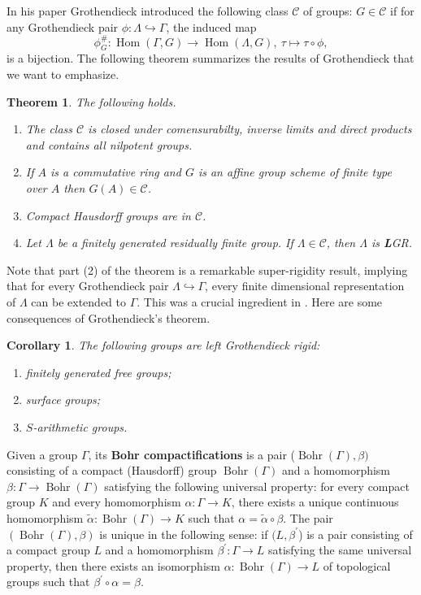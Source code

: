 \documentclass{amsart}
\newtheorem{teo}[lem]{Theorem}
\newtheorem{cor}[lem]{Corollary}
\theoremstyle{definition}
\theoremstyle{remark}
\DeclareMathOperator{\B}{Bohr}
\DeclareMathOperator{\Hom}{Hom}
\begin{document}
 
In his paper Grothendieck introduced the   following class  $\mathcal C$ of groups: $G\in  \mathcal C$ if for any Grothendieck pair $\phi:\Lambda \hookrightarrow \Gamma$, the induced map 
$$\phi^{\#}_G: \Hom (\Gamma, G)\to \Hom (\Lambda, G), \ \tau\mapsto \tau\circ \phi,$$  is a bijection. The following theorem summarizes the results of Grothendieck that we want to emphasize.
\begin{teo}\label{grothendieck}
The following holds.

\begin{enumerate}
\item The class $\mathcal C$  is closed under comensurabilty, inverse limits and direct products and contains all nilpotent groups.
\item If $A$ is a commutative  ring and $G$ is an affine group scheme of finite type over $A$ then $G(A)\in \mathcal C$.
\item Compact Hausdorff  groups are in $\mathcal C$.
\item Let $\Lambda$ be a  finitely generated residually finite group. If $\Lambda \in \mathcal C$, then $\Lambda$ is {\textbf L}GR.

\end{enumerate}
\end{teo}

Note that part (2) of the theorem is a remarkable super-rigidity result, implying that for every Grothendieck pair $\Lambda\hookrightarrow \Gamma$, every finite dimensional representation of $\Lambda$ can be extended to $\Gamma$. This was a crucial ingredient in \cite{BL00}.
Here are some consequences of Grothendieck's theorem.
 \begin{cor}\label{leftGR}
 The following groups are left  Grothendieck rigid:
 
 \begin{enumerate}
 \item finitely generated free groups;
 \item surface groups;
 \item $S$-arithmetic groups.
 \end{enumerate}
 \end{cor}
 Given a group $\Gamma$, its {\bf Bohr compactifications} is   a pair   ($\B(\Gamma), \beta)$ consisting of a compact (Hausdorff) group $\B(\Gamma)$
and a  homomorphism $\beta : \Gamma \to \B(\Gamma)$
  satisfying the following universal property: for every
compact group  $K$ and every 
homomorphism $\alpha : \Gamma \to K$, there exists a unique continuous homomorphism $\widetilde \alpha: \B(\Gamma)\to K$ such that $\alpha=\widetilde \alpha \circ \beta$. The pair $(\B(\Gamma), \beta)$ is unique in the following sense: if
$(L,\beta^\prime$) is a pair consisting of a compact group $L$ and a  
homomorphism $\beta^\prime : \Gamma \to L$  satisfying the same
universal property, then there exists  an isomorphism $\alpha : \B(\Gamma) \to L$ of topological
groups such that $\beta^\prime \circ \alpha=\beta$.
\end{document}
